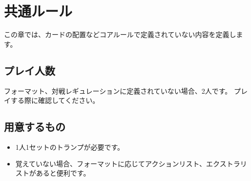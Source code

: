 \documentclass[letterpaper,10pt,dvipdfmx]{sphinxmanual}
\begin{document}
\sphinxstepscope


\chapter{共通ルール}
\label{\detokenize{common/common:id1}}\label{\detokenize{common/common::doc}}
\sphinxAtStartPar
この章では、カードの配置などコアルールで定義されていない内容を定義します。


\section{プレイ人数}
\label{\detokenize{common/common:id2}}
\sphinxAtStartPar
フォーマット、対戦レギュレーションに定義されていない場合、2人です。
プレイする際に確認してください。


\section{用意するもの}
\label{\detokenize{common/common:id3}}\begin{itemize}
\item {} 
\sphinxAtStartPar
1人1セットのトランプが必要です。

\item {} 
\sphinxAtStartPar
覚えていない場合、フォーマットに応じてアクションリスト、エクストラリストがあると便利です。

\end{itemize}
\end{document}
